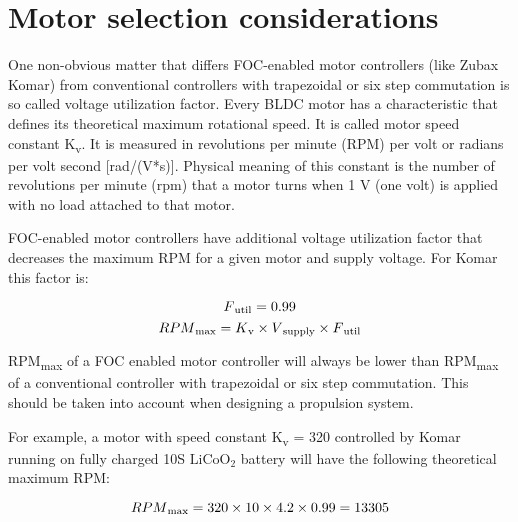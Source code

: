 \chapter{Motor selection considerations}
One non-obvious matter that differs FOC-enabled motor controllers (like Zubax Komar)
from conventional controllers with trapezoidal or six step commutation
is so called voltage utilization factor.
Every BLDC motor has a characteristic that defines its theoretical maximum rotational speed.
It is called  motor speed constant K\textsubscript{v}.
It is measured in revolutions per minute (RPM) per volt or radians per volt second [rad/(V*s)].
Physical meaning of this constant is the number of revolutions per minute (rpm) that a motor turns when 1 V (one volt)
is applied with no load attached to that motor.

FOC-enabled motor controllers have additional voltage utilization factor that decreases the maximum RPM
for a given motor and supply voltage. For Komar this factor is:

\[F\textsubscript{util} = 0.99\]
\[RPM\textsubscript{max} = K\textsubscript{v} \times V\textsubscript{supply} \times F\textsubscript{util}\]

RPM\textsubscript{max} of a FOC enabled motor controller will always be lower than RPM\textsubscript{max} 
of a conventional controller with trapezoidal or six step commutation. This should be taken into account 
when designing a propulsion system.

For example, a motor with speed constant K\textsubscript{v} = 320 controlled by Komar
running on fully charged 10S $\text{LiCoO}_\text{2}$ battery will have the following theoretical maximum RPM:

\[RPM\textsubscript{max} = 320 \times 10 \times 4.2 \times 0.99 = 13305\]